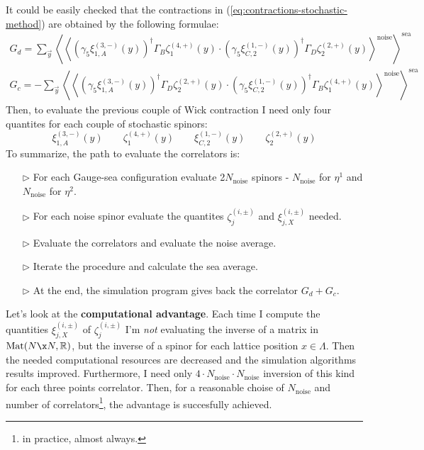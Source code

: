 \documentclass[english, LaM, oneside, noexaminfo]{sapthesis}
\begin{document}
It could be easily checked that the contractions in (\ref{eq:contractions-stochastic-method}) are obtained by the following formulae:
\begin{equation*}
    \begin{gathered}
        G_d =   \sum_{\vec y} \left\langle \left\langle \left(\gamma_5\xi^{(3,-)}_{1,A} (y) \right)^\dag \Gamma_B \zeta^{(4,+)}_1 (y) \cdot \left(\gamma_5\xi^{(1,-)}_{C,2} (y) \right)^\dag \Gamma_D \zeta^{(2,+)}_2 (y) \right\rangle^\text{noise} \right\rangle^{\text{sea}} \\
        G_c = - \sum_{\vec y} \left\langle \left\langle \left(\gamma_5\xi^{(3,-)}_{1,A} (y) \right)^\dag \Gamma_D \zeta^{(2,+)}_2 (y) \cdot \left(\gamma_5\xi^{(1,-)}_{C,2} (y) \right)^\dag \Gamma_B \zeta^{(4,+)}_1 (y) \right\rangle^\text{noise} \right\rangle^{\text{sea}}
    \end{gathered}
\end{equation*}
Then, to evaluate the previous couple of Wick contraction I need only four quantites for each couple of stochastic spinors:
\begin{equation*}
    \xi^{(3,-)}_{1,A} (y) \qquad  \zeta^{(4,+)}_1 (y) \qquad \xi^{(1,-)}_{C,2} (y) \qquad  \zeta^{(2,+)}_2 (y)
\end{equation*}
To summarize, the path to evaluate the correlators is:
\begin{itemize}
    \item [$\triangleright$] For each Gauge-sea configuration evaluate 2$N_{\text{noise}}$ spinors - $N_{\text{noise}}$ for $\eta^1$ and $N_{\text{noise}}$ for $\eta^2$. 
    \item [$\triangleright$] For each noise spinor evaluate the quantites $\zeta^{(i,\pm)}_j$ and $\xi^{(i,\pm)}_{j,X}$ needed.
    \item [$\triangleright$] Evaluate the correlators and evaluate the noise average.
    \item [$\triangleright$] Iterate the procedure and calculate the sea average.
    \item [$\triangleright$] At the end, the simulation program gives back the correlator $G_d+G_c$.
\end{itemize}
Let's look at the {\bf computational advantage}.
Each time I compute the quantities $\xi^{(i,\pm)}_{j,X}$ of $\zeta^{(i,\pm)}_j$ I'm {\it not} evaluating the inverse of a matrix in $\text{Mat}(N\x N, \mathbb{R})$, but the inverse of a spinor for each lattice position $x\in \Lambda$.
Then the needed computational resources are decreased and the simulation algorithms results improved.
Furthermore, I need only $4\cdot N_\text{noise} \cdot N_\text{noise}$ inversion of this kind for each three points correlator.
Then, for a reasonable choise of $N_\text{noise}$ and number of correlators\footnote{in practice, almost always.}, the advantage is succesfully achieved.
\end{document}
